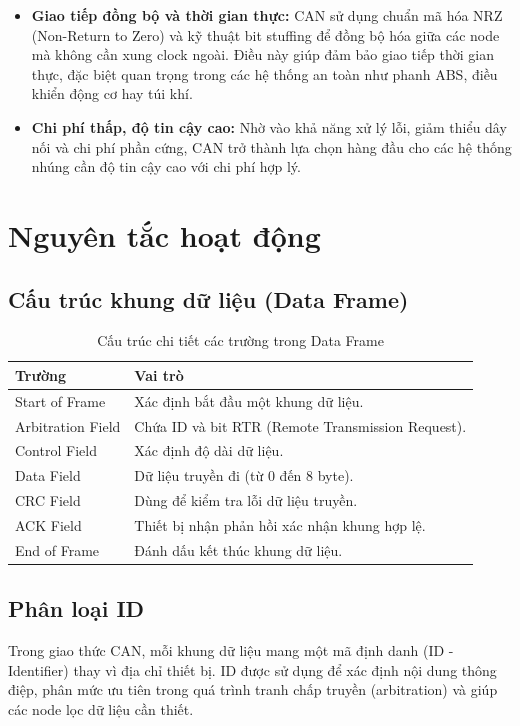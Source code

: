 \begin{itemize}[leftmargin=*]
\begin{itemize}
    \end{itemize}
    Điều này làm cho CAN phù hợp với cả hệ thống nhỏ lẫn hệ thống phân tán rộng.
    \item \textbf{Giao tiếp đồng bộ và thời gian thực:} CAN sử dụng chuẩn mã hóa NRZ (Non-Return to Zero) và kỹ thuật bit stuffing để đồng bộ hóa giữa các node mà không cần xung clock ngoài. Điều này giúp đảm bảo giao tiếp thời gian thực, đặc biệt quan trọng trong các hệ thống an toàn như phanh ABS, điều khiển động cơ hay túi khí.
    \item \textbf{Chi phí thấp, độ tin cậy cao:} Nhờ vào khả năng xử lý lỗi, giảm thiểu dây nối và chi phí phần cứng, CAN trở thành lựa chọn hàng đầu cho các hệ thống nhúng cần độ tin cậy cao với chi phí hợp lý.
\end{itemize}

\section{Nguyên tắc hoạt động}

\subsection{Cấu trúc khung dữ liệu (Data Frame)}
\begin{table}[h!]
\centering
\begin{tabularx}{\textwidth}{l X}
\toprule
\textbf{Trường} & \textbf{Vai trò} \\
\midrule
Start of Frame & Xác định bắt đầu một khung dữ liệu. \\
Arbitration Field & Chứa ID và bit RTR (Remote Transmission Request). \\
Control Field & Xác định độ dài dữ liệu. \\
Data Field & Dữ liệu truyền đi (từ 0 đến 8 byte). \\
CRC Field & Dùng để kiểm tra lỗi dữ liệu truyền. \\
ACK Field & Thiết bị nhận phản hồi xác nhận khung hợp lệ. \\
End of Frame & Đánh dấu kết thúc khung dữ liệu. \\
\bottomrule
\end{tabularx}
\caption{Cấu trúc chi tiết các trường trong Data Frame}
\end{table}

\subsection{Phân loại ID}
Trong giao thức CAN, mỗi khung dữ liệu mang một mã định danh (ID - Identifier) thay vì địa chỉ thiết bị. ID được sử dụng để xác định nội dung thông điệp, phân mức ưu tiên trong quá trình tranh chấp truyền (arbitration) và giúp các node lọc dữ liệu cần thiết.

